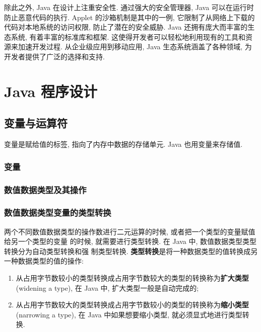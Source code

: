 \documentclass[10pt,UTF8]{book} %
\begin{document}
\vspace*{1cm}

除此之外,
Java 在设计上注重安全性. 通过强大的安全管理器, Java 可以在运行时防止恶意代码的执行. 
Applet 的沙箱机制是其中的一例, 它限制了从网络上下载的代码对本地系统的访问权限, 
防止了潜在的安全威胁. 
Java 还拥有庞大而丰富的生态系统, 有着丰富的标准库和框架. 
这使得开发者可以轻松地利用现有的工具和资源来加速开发过程. 从企业级应用到移动应用, 
Java 生态系统涵盖了各种领域, 为开发者提供了广泛的选择和支持. 

\newpage
\thispagestyle{empty}

\part{Java 程序设计}

\chapter{变量与运算符}

\quad\quad 变量是赋给值的标签, 指向了内存中数据的存储单元. Java 也用变量来存储值.

\section{变量}
\section{数值数据类型及其操作}

\newpage
\section{数值数据类型变量的类型转换}

两个不同数值数据类型的操作数进行二元运算的时候, 或者把一个类型的变量赋值给另一个类型的变量
的时候, 就需要进行类型转换. 在 Java 中, 数值数据类型类型转换分为自动类型转换和强
制类型转换. \textbf{类型转换}是将一种数据类型的值转换成另一种数据类型的值的操作:
\begin{enumerate}[label=(\arabic*), itemsep=0pt]
    \item 从占用字节数较小的类型转换成占用字节数较大的类型的转换称为\textbf{扩大类型}
    (widening a type), 在 Java 中, 扩大类型一般是自动完成的;
    \item 从占用字节数较大的类型转换成占用字节数较小的类型的转换称为\textbf{缩小类型}
    (narrowing a type), 在 Java 中如果想要缩小类型, 就必须显式地进行类型转换.
\end{enumerate}
\end{document}
